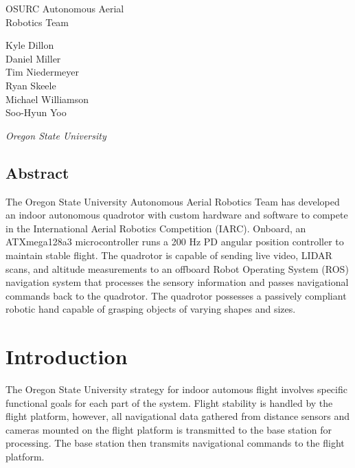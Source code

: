 \documentclass[12pt,letterpaper]{article}
\begin{document}
\begin{center}
{\huge
    OSURC Autonomous Aerial \\ Robotics Team\\[1cm]
}
{
Kyle Dillon \\
Daniel Miller \\
Tim Niedermeyer \\
Ryan Skeele \\
Michael Williamson \\
Soo-Hyun Yoo \\ \vspace{0.5em}

\emph{Oregon State University}
}

\end{center}

\begin{center}
\begin{minipage}{5.5in}

\section*{Abstract}

The Oregon State University Autonomous Aerial Robotics Team has developed
an indoor autonomous quadrotor with custom hardware and software to compete
in the International Aerial Robotics Competition (IARC). Onboard, an
ATXmega128a3 microcontroller runs a 200 Hz PD angular position controller
to maintain stable flight. The quadrotor is capable of sending live video,
LIDAR scans, and altitude measurements to an offboard Robot Operating
System (ROS) navigation system that processes the sensory information and
passes navigational commands back to the quadrotor. The quadrotor possesses
a passively compliant robotic hand capable of grasping objects of varying
shapes and sizes.

\end{minipage}
\end{center}


\section*{Introduction}

The Oregon State University strategy for indoor automous flight involves
specific functional goals for each part of the system. Flight stability is
handled by the flight platform, however, all navigational data gathered from
distance sensors and cameras mounted on the flight platform is transmitted to
the base station for processing. The base station then transmits navigational
commands to the flight platform.
\end{document}
